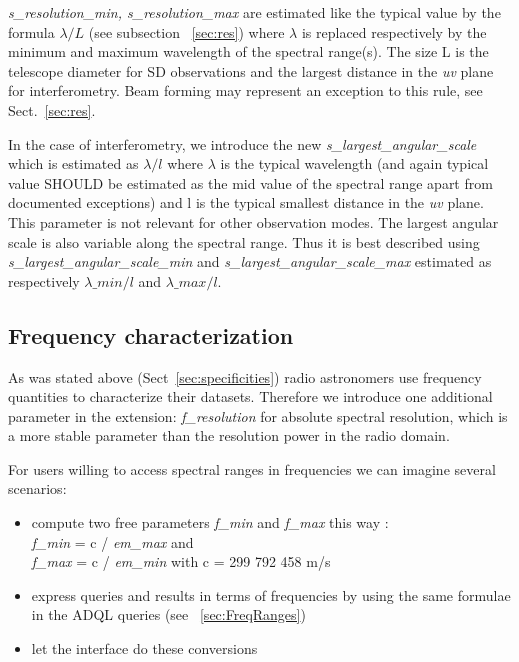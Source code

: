 \documentclass[11pt,a4paper]{ivoa}
\begin{document}
\emph{s\_resolution\_min, s\_resolution\_max} are estimated like the typical value by the formula  $\lambda / L$  (see subsection ~\ref{sec:res}) where $\lambda$ is replaced respectively by the minimum and maximum wavelength of the spectral range(s). The size L is the telescope diameter for SD observations and the largest distance in the \emph{uv} plane for interferometry. Beam forming may represent an exception to this rule, see Sect.~\ref{sec:res}.

In the case of interferometry, we introduce the new \emph{s\_largest\_angular\_scale} which is estimated as $\lambda/l$ where $\lambda$ is the typical
wavelength (and again typical value SHOULD be estimated as the mid value of the spectral range apart from documented exceptions) and l is the typical smallest distance in the \emph{uv} plane. 
This parameter is not relevant for other observation modes.
The largest angular scale is also variable along the spectral range. 
Thus it is best described using \emph{s\_largest\_angular\_scale\_min} and
\emph{s\_largest\_angular\_scale\_max} estimated as  respectively $\lambda\_min/l$ and  $\lambda\_max/l$.

\subsection{Frequency characterization}


As was stated above (Sect~\ref{sec:specificities}) radio astronomers use frequency quantities to characterize their datasets. 
Therefore we introduce one additional parameter in the extension:
\emph{f\_resolution} for absolute spectral resolution, which is a more stable parameter than the resolution power in the radio domain.

For users willing to access spectral ranges in frequencies we can imagine several scenarios:
\begin{itemize}
	\item compute two free parameters \emph{f\_min} and \emph{f\_max} this way : \\
	\emph{f\_min} = c / \emph{em\_max} and \\
	\emph{f\_max} = c / \emph{em\_min} with c = 299 792 458 m/s
	\item express queries and results in terms of frequencies by using the same  formulae in the ADQL queries (see ~\ref{sec:FreqRanges})
	\item let the interface do these conversions 	
\end{itemize}
\end{document}
